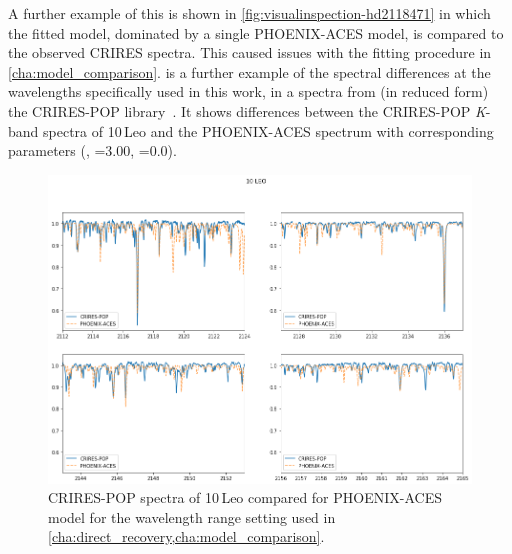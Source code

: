 A further example of this is shown in \cref{fig:visualinspection-hd2118471} in which the fitted model, dominated by a single {PHOENIX-ACES} model, is compared to the observed {CRIRES} spectra.
This caused issues with the fitting procedure in \cref{cha:model_comparison}.
 is a further example of the spectral differences at the \nir{} wavelengths specifically used in this work, in a spectra from (in reduced form) the CRIRES-POP library~\citep{lebzelter_crirespop_2012,nicholls_crirespop_2017}.
It shows differences between the CRIRES-POP \emph{K}-band spectra of {10\,Leo} and the {PHOENIX-ACES} spectrum with corresponding parameters (, \logg{}=3.00, \feh{}=0.0).


\begin{figure}
    \centering
    \includegraphics[width=0.7\linewidth]{figures/atmos_and_models/CRIRES-POP-mismatch}
    \caption[Comparision of the spectrum of {10\,Leo} to synthetic {PHOENIX-ACES} spectum.]{CRIRES-POP spectra of {10\,Leo} compared for {PHOENIX-ACES} model for the wavelength range setting used in \cref{cha:direct_recovery,cha:model_comparison}.}
    \label{fig:crires-pop-mismatch}
\end{figure}
